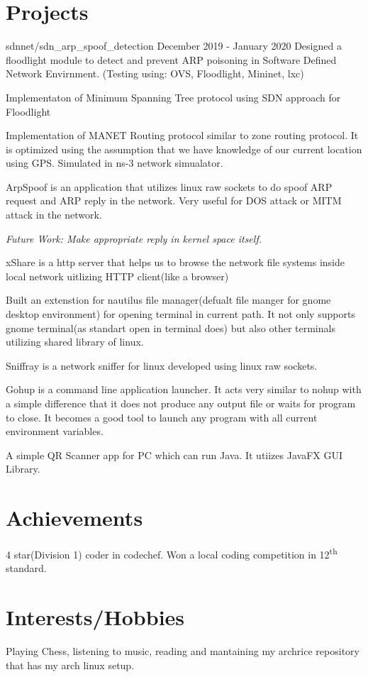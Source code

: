 \documentclass{article}
\begin{document}
\section{Projects}

{sdnnet/sdn\_arp\_spoof\_detection}
{December 2019 - January 2020}
Designed a floodlight module to detect and prevent ARP poisoning in Software Defined Network Envirnment. (Testing using: OVS, Floodlight, Mininet, lxc)

Implementaton of Minimum Spanning Tree protocol using SDN approach for Floodlight

Implementation of MANET Routing protocol similar to zone routing protocol. It is optimized using the assumption that we have knowledge of our current location using GPS. Simulated in ns-3 network simualator.

ArpSpoof is an application that utilizes linux raw sockets to do spoof ARP request and ARP reply in the network. Very useful for DOS attack or MITM attack in the network.

\textit{Future Work: Make appropriate reply in kernel space itself.}

xShare is a http server  that helps us to browse the network file systems inside local network uitlizing HTTP client(like a browser)

Built an extenstion for nautilus file manager(defualt file manger for gnome desktop environment) for opening terminal in current path. It not only supports gnome terminal(as standart open in terminal does) but also other terminals utilizing shared library of linux.

Sniffray is a network sniffer for linux developed using linux raw sockets.

Gohup is a command line application launcher. It acts very similar to nohup with a simple difference that it does not produce any output file or waits for program to close. It becomes a good tool to launch any program with all current environment variables.

A simple QR Scanner app for PC which can run Java. It utiizes JavaFX GUI Library.


\section{Achievements}
4 star(Division 1) coder in codechef. Won a local coding competition in 12\textsuperscript{th} standard.

\section{Interests/Hobbies}

Playing Chess, listening to music, reading and mantaining my archrice repository that has my arch linux setup.
\printbibliography
\end{document}
